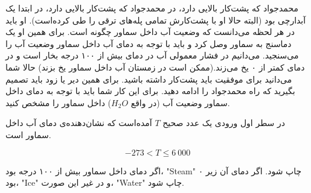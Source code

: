 \begin{problem}{}
{}{}
{}{}{}
    محمدجواد که پشت‌کار بالایی دارد، در محمدجواد که پشت‌کار بالایی دارد، در ابتدا یک آبدارچی بود (البته حالا او با پشت‌کارش تمامی پله‌های ترقی را طی کرده‌است). او باید در هر لحظه می‌دانست که وضعیت آب داخل سماور چگونه است. برای همین او یک دماسنج به سماور وصل کرد و باید با توجه به دمای آب داخل سماور وضعیت آب را می‌سنجید. می‌دانیم در فشار معمولی آب در دمای بیش از ۱۰۰ درجه بخار است و در دمای کمتر از ۰ یخ می‌زند.(ممکن است در زمستان آب داخل سماور یخ بزند)
    حالا شما می‌دانید برای موفقیت باید پشت‌کار داشته باشید. برای همین دیر یا زود باید تصمیم بگیرید که راه محمدجواد را ادامه دهید. برای این کار شما باید با توجه به دمای داخل سماور وضعیت آب (در واقع $H_2O$) داخل سماور را مشخص کنید.

    \InputFile
    در سطر اول ورودی یک عدد صحیح $T$ آمده‌است که نشان‌دهنده‌ی دمای آب داخل سماور است.

    $$ -273 < T \le 6\ 000$$



    \OutputFile

    اگر دمای داخل سماور بیش از ۱۰۰ درجه بود، "Steam" چاپ شود. اگر دمای آن زیر ۰ بود، "Ice" و در غیر این صورت، "Water" چاپ شود.
    \Examples

    \Example
    \begin{example}
    \end{example}

    \Example
    \begin{example}
    \end{example}

    \Example
    \begin{example}
    \end{example}


\end{problem}
